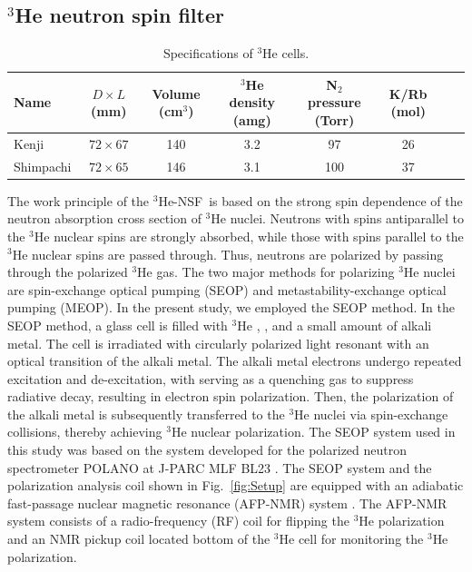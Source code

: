 \documentclass[%
 reprint,
superscriptaddress,
 amsmath,amssymb,
 aps,
floatfix,
]{revtex4-2}
\newcommand{\He}{$^3$He }
\newcommand{\Hensf}{$^3$He-NSF}
\begin{document}
\subsection{\He neutron spin filter}
\begin{table}[t]
\caption{Specifications of \He cells.}
\label{tab:He_cell}
\begin{ruledtabular}
    \begin{tabular*}{\textwidth}{lccccccc}
        Name
        & $D \times L$ (mm)
        & Volume (cm$^3$)
        & \He density (amg)
        & N$_2$ pressure (Torr)
        & K/Rb (mol)\\
        \hline
        Kenji
        & $72 \times 67$
        & 140
        & 3.2
        & 97
        & 26\\
        Shimpachi
        & $72 \times 65$
        & 146
        & 3.1
        & 100
        & 37\\
    \end{tabular*}
\end{ruledtabular}
\end{table}
The work principle of the \Hensf~is based on the strong spin dependence of the neutron absorption cross section of \He nuclei.
Neutrons with spins antiparallel to the \He nuclear spins are strongly absorbed, while those with spins parallel to the \He nuclear spins are passed through.
Thus, neutrons are polarized by passing through the polarized \He gas.
The two major methods for polarizing \He nuclei are spin-exchange optical pumping (SEOP) \cite{bouchiat_nuclear_1960} and metastability-exchange optical pumping (MEOP).
In the present study, we employed the SEOP method.
In the SEOP method, a glass cell is filled with \He, , and a small amount of alkali metal.
The cell is irradiated with circularly polarized light resonant with an optical transition of the alkali metal.
The alkali metal electrons undergo repeated excitation and de-excitation, with  serving as a quenching gas to suppress radiative decay, resulting in electron spin polarization.
Then, the polarization of the alkali metal is subsequently transferred to the \He nuclei via spin-exchange collisions, thereby achieving \He nuclear polarization.
The SEOP system used in this study was based on the system developed for the polarized neutron spectrometer POLANO at J-PARC MLF BL23 \cite{ino_development_2017}.
The SEOP system and the polarization analysis coil shown in Fig.~\ref{fig:Setup} are equipped with an adiabatic fast-passage nuclear magnetic resonance (AFP-NMR) system \cite{ino_compact_2012}.
The AFP-NMR system consists of a radio-frequency (RF) coil for flipping the \He polarization and an NMR pickup coil located bottom of the \He cell for monitoring the \He polarization.
\end{document}
